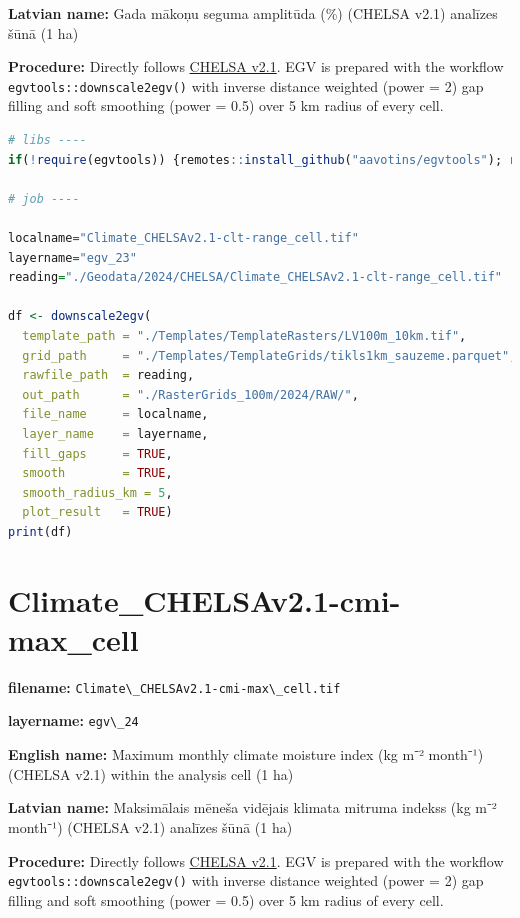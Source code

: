\documentclass[
]{book}
\newcommand{\passthrough}[1]{#1}
\begin{document}
\textbf{Latvian name:} Gada mākoņu seguma amplitūda (\%) (CHELSA v2.1) analīzes šūnā (1 ha)

\textbf{Procedure:} Directly follows \hyperref[Ch04.11]{CHELSA v2.1}. EGV is prepared with the
workflow \passthrough{\lstinline!egvtools::downscale2egv()!} with inverse distance weighted (power = 2)
gap filling and soft smoothing (power = 0.5) over 5 km radius of every cell.

\begin{lstlisting}[language=R]
# libs ----
if(!require(egvtools)) {remotes::install_github("aavotins/egvtools"); require(egvtools)}

# job ----

localname="Climate_CHELSAv2.1-clt-range_cell.tif"
layername="egv_23"
reading="./Geodata/2024/CHELSA/Climate_CHELSAv2.1-clt-range_cell.tif"

df <- downscale2egv(
  template_path = "./Templates/TemplateRasters/LV100m_10km.tif",
  grid_path     = "./Templates/TemplateGrids/tikls1km_sauzeme.parquet",
  rawfile_path  = reading,
  out_path      = "./RasterGrids_100m/2024/RAW/",
  file_name     = localname,
  layer_name    = layername,
  fill_gaps     = TRUE,
  smooth        = TRUE,
  smooth_radius_km = 5,
  plot_result   = TRUE)
print(df)
\end{lstlisting}

\section{Climate\_CHELSAv2.1-cmi-max\_cell}\label{ch06.024}

\textbf{filename:} \passthrough{\lstinline!Climate\_CHELSAv2.1-cmi-max\_cell.tif!}

\textbf{layername:} \passthrough{\lstinline!egv\_24!}

\textbf{English name:} Maximum monthly climate moisture index (kg m⁻² month⁻¹) (CHELSA v2.1) within the analysis cell (1 ha)

\textbf{Latvian name:} Maksimālais mēneša vidējais klimata mitruma indekss (kg m⁻² month⁻¹) (CHELSA v2.1) analīzes šūnā (1 ha)

\textbf{Procedure:} Directly follows \hyperref[Ch04.11]{CHELSA v2.1}. EGV is prepared with the
workflow \passthrough{\lstinline!egvtools::downscale2egv()!} with inverse distance weighted (power = 2)
gap filling and soft smoothing (power = 0.5) over 5 km radius of every cell.
\end{document}
